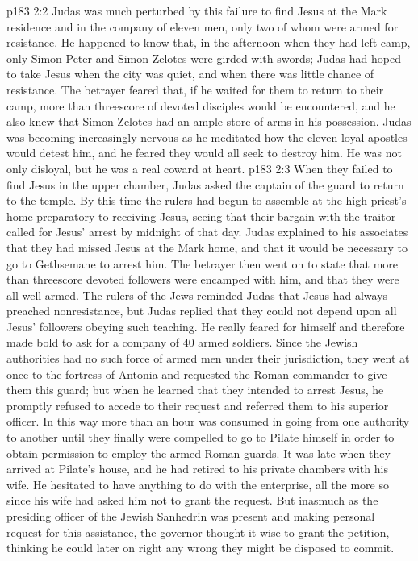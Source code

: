 \vs p183 2:2 Judas was much perturbed by this failure to find Jesus at the Mark residence and in the company of eleven men, only two of whom were armed for resistance. He happened to know that, in the afternoon when they had left camp, only Simon Peter and Simon Zelotes were girded with swords; Judas had hoped to take Jesus when the city was quiet, and when there was little chance of resistance. The betrayer feared that, if he waited for them to return to their camp, more than threescore of devoted disciples would be encountered, and he also knew that Simon Zelotes had an ample store of arms in his possession. Judas was becoming increasingly nervous as he meditated how the eleven loyal apostles would detest him, and he feared they would all seek to destroy him. He was not only disloyal, but he was a real coward at heart.
\vs p183 2:3 When they failed to find Jesus in the upper chamber, Judas asked the captain of the guard to return to the temple. By this time the rulers had begun to assemble at the high priest’s home preparatory to receiving Jesus, seeing that their bargain with the traitor called for Jesus’ arrest by midnight of that day. Judas explained to his associates that they had missed Jesus at the Mark home, and that it would be necessary to go to Gethsemane to arrest him. The betrayer then went on to state that more than threescore devoted followers were encamped with him, and that they were all well armed. The rulers of the Jews reminded Judas that Jesus had always preached nonresistance, but Judas replied that they could not depend upon all Jesus’ followers obeying such teaching. He really feared for himself and therefore made bold to ask for a company of 40 armed soldiers. Since the Jewish authorities had no such force of armed men under their jurisdiction, they went at once to the fortress of Antonia and requested the Roman commander to give them this guard; but when he learned that they intended to arrest Jesus, he promptly refused to accede to their request and referred them to his superior officer. In this way more than an hour was consumed in going from one authority to another until they finally were compelled to go to Pilate himself in order to obtain permission to employ the armed Roman guards. It was late when they arrived at Pilate’s house, and he had retired to his private chambers with his wife. He hesitated to have anything to do with the enterprise, all the more so since his wife had asked him not to grant the request. But inasmuch as the presiding officer of the Jewish Sanhedrin was present and making personal request for this assistance, the governor thought it wise to grant the petition, thinking he could later on right any wrong they might be disposed to commit.
